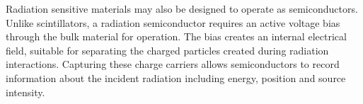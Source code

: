\documentclass[../../../main.tex]{subfiles}
\begin{document}
%
    \Xsubsection%
    Radiation sensitive materials may also be designed to operate as semiconductors.
    Unlike scintillators, a radiation semiconductor requires an active voltage bias through the bulk material for operation.
    The bias creates an internal electrical field, suitable for separating the charged particles created during radiation interactions.
    Capturing these charge carriers allows semiconductors to record information about the incident radiation including energy, position and source intensity.
\end{document}
